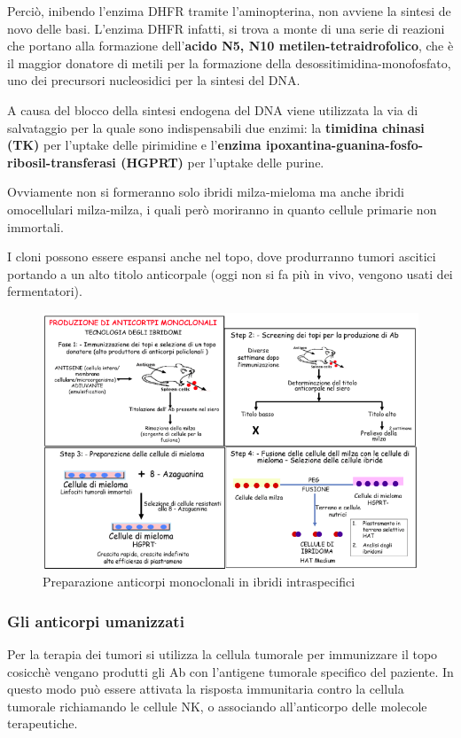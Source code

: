 \documentclass[11pt]{book}
\begin{document}
Perciò, inibendo l'enzima DHFR tramite l'aminopterina, non avviene la sintesi de novo delle basi. L’enzima DHFR infatti, si trova a monte di una serie di reazioni che portano alla formazione dell’\textbf{acido N5, N10 metilen-tetraidrofolico}, che è il maggior donatore di metili per la formazione della desossitimidina-monofosfato, uno dei precursori nucleosidici per la sintesi del DNA.

A causa del blocco della sintesi endogena del DNA viene utilizzata la via di salvataggio per la quale sono indispensabili due enzimi: la \textbf{timidina chinasi (TK)} per l’uptake delle pirimidine e l’\textbf{enzima ipoxantina-guanina-fosfo-ribosil-transferasi (HGPRT)} per l’uptake delle purine.

Ovviamente non si formeranno solo ibridi milza-mieloma ma anche ibridi omocellulari milza-milza, i quali però moriranno in quanto cellule primarie non immortali.

I cloni possono essere espansi anche nel topo, dove produrranno tumori ascitici portando a un alto titolo anticorpale (oggi non si fa più in vivo, vengono usati dei fermentatori).

\begin{figure}[h!]
\centering
\includegraphics[scale=0.65]{img/28_anticorpi_monoclonali.png}
\caption{Preparazione anticorpi monoclonali in ibridi intraspecifici}
\label{}
\end{figure}

\subsubsection{Gli anticorpi umanizzati}
Per la terapia dei tumori si utilizza la cellula tumorale per immunizzare il topo cosicchè vengano produtti gli Ab con l'antigene tumorale specifico del paziente. 
In questo modo può essere attivata la risposta immunitaria contro la cellula tumorale richiamando le cellule NK, o associando all’anticorpo delle molecole terapeutiche.
\end{document}
